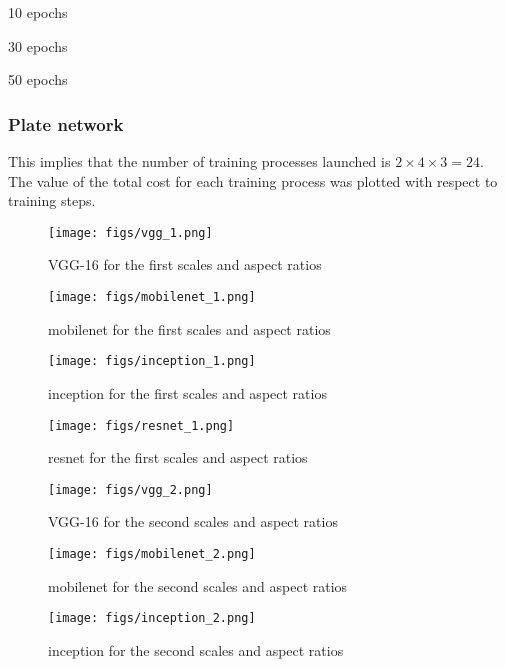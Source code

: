 \begin{compactitem}
	\item 10 epochs
	\item 30 epochs
	\item 50 epochs
\end{compactitem}

\subsubsection{Plate network}
This implies that the number of training processes launched is $2 \times 4 \times 3 = 24$. The value of the total cost for each training process was plotted with respect to training steps.

\begin{figure}[!htpb]
	\centering
	\texttt{[image: figs/vgg\_1.png]}
	\caption{VGG-16 for the first scales and aspect ratios}\label{fig:vgg3_}
\end{figure}

\begin{figure}[!htpb]
	\centering
	\texttt{[image: figs/mobilenet\_1.png]}
	\caption{mobilenet for the first scales and aspect ratios}\label{fig:mobilenet3_}
\end{figure}

\begin{figure}[!htpb]
	\centering
	\texttt{[image: figs/inception\_1.png]}
	\caption{inception for the first scales and aspect ratios}\label{fig:inception1_}
\end{figure}

\begin{figure}[!htpb]
	\centering
	\texttt{[image: figs/resnet\_1.png]}
	\caption{resnet for the first scales and aspect ratios}\label{fig:resnet1_}
\end{figure}

\begin{figure}[!htpb]
	\centering
	\texttt{[image: figs/vgg\_2.png]}
	\caption{VGG-16 for the second scales and aspect ratios}\label{fig:vgg4_}
\end{figure}

\begin{figure}[!htpb]
	\centering
	\texttt{[image: figs/mobilenet\_2.png]}
	\caption{mobilenet for the second scales and aspect ratios}\label{fig:mobilenet4_}
\end{figure}

\begin{figure}[!htpb]
	\centering
	\texttt{[image: figs/inception\_2.png]}
	\caption{inception for the second scales and aspect ratios}\label{fig:inception4_}
\end{figure}

